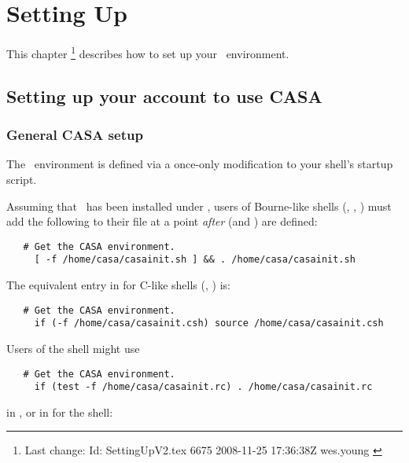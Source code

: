 \chapter{Setting Up}
\label{Setting Up}

This chapter \footnote{Last change:
$ $Id: SettingUpV2.tex 6675 2008-11-25 17:36:38Z wes.young $ $}
describes how to set up your \aipspp\ environment.


\section{Setting up your account to use CASA}
\label{Setup}

\subsection{General CASA setup}

The \aipspp\ environment is defined via a once-only modification to your
shell's startup script.

Assuming that \aipspp\ has been installed under , users of
Bourne-like shells (, , ) must add the
following to their  file at a point {\em after} 
(and ) are defined:

\begin{verbatim}
   # Get the CASA environment.
     [ -f /home/casa/casainit.sh ] && . /home/casa/casainit.sh
\end{verbatim}

\noindent
The equivalent entry in  for C-like shells (,
) is:

\begin{verbatim}
   # Get the CASA environment.
     if (-f /home/casa/casainit.csh) source /home/casa/casainit.csh
\end{verbatim}

\noindent
Users of the  shell might use

\begin{verbatim}
   # Get the CASA environment.
     if (test -f /home/casa/casainit.rc) . /home/casa/casainit.rc
\end{verbatim}

\noindent
in , or in  for the  shell:

